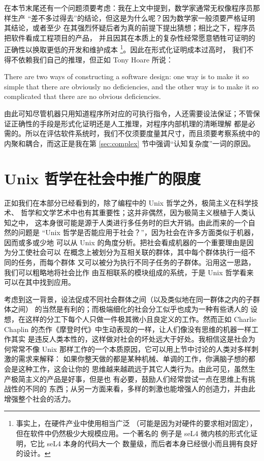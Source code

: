 在本节末尾还有一个问题须要考虑：我在上文中提到，数学家通常无权像程序员那样生产
“差不多过得去”的结论，但这是为什么呢？因为数学家一般须要严格证明其结论，或者至少
在其强烈怀疑后者为真的前提下提出猜想；相比之下，程序员把软件看成工程项目的产品，
并且因其在本质上的复杂性经常愿意牺牲可证明的正确性以换取更低的开发和维护成本%
\footnote{\label{fn:formal}事实上，在硬件产业中使用相当广泛
（可能是因为对硬件的要求相对固定），但在软件中仍然极少大规模应用。一个著名的
例子是 seL4 微内核的形式化证明，它比 seL4 本身的代码大一个
数量级，而后者本身已经很小而且拥有良好的设计。}。因此在形式化证明成本过高时，
我们不得不依赖我们自己的推理，但正如 Tony Hoare 所说：
\begin{quoting}
	There are two ways of constructing a software design: one way is to make
	it so simple that there are obviously no deficiencies, and the other way
	is to make it so complicated that there are no obvious deficiencies.
\end{quoting}
由此可知尽管机器只用知道程序所对应的可执行指令，人还需要设法保证；不管保证正确性的手段是形式化证明还是人工推理，对程序内部机理的清晰理解
都是必需的。所以在评估软件系统时，我们不仅须要度量其尺寸，而且须要考察系统中的
内聚和耦合，而这正是我在第 \ref{sec:complex} 节中强调“认知复杂度”一词的原因。

\section{Unix 哲学在社会中推广的限度}\label{sec:society}

正如我们在本部分已经看到的，除了编程中的 Unix 哲学之外，极简主义在科学技术、
哲学和文学艺术中也有其重要性；这并非偶然，因为极简主义根植于人类认知之中，
这本身很可能是源于人类进行多任务时的巨大开销。由此而来的一个自然的问题是
“Unix 哲学是否能应用于社会？”，因为社会在许多方面类似于机器，因而或多或少地
可以从 Unix 的角度分析。把社会看成机器的一个重要理由是因为分工使社会可以
在概念上被划分为互相关联的群体，其中每个群体执行一组不同的任务，而每个群体
又可以被分为执行不同子任务的子群体。沿用这一思路，我们可以粗略地将社会比作
由互相联系的模块组成的系统，于是 Unix 哲学看来可以在其中找到应用。

考虑到这一背景，设法促成不同社会群体之间（以及类似地在同一群体之内的子群体之间）
的当然是有利的；而极端细化的社会分工似乎也成为一种有些诱人的
设想，在这样的分工下每个人只做一件极其微小且良定义的工作。然而正如 Charlie
Chaplin 的杰作《摩登时代》中生动表现的一样，让人们像没有思维的机器一样工作其实
是违反人类本性的，这样做对社会的坏处远大于好处。我相信这是社会为何常常不像
Unix 那样工作的一个本质原因，它可以用上节中讨论的人类对多样刺激的需求来解释：
如果你整天做的都是某种机械、单调的工作，你满脑子想的都会是这种工作，这会让你的
思维越来越疏远于其它人类行为。由此可见，虽然生产极简主义的产品是好事，但是也
有必要，鼓励人们经常尝试一点在思维上有挑战性的不同的
东西；从另一方面来看，多样的刺激也能增强人的创造力，并由此增强整个社会的活力。

